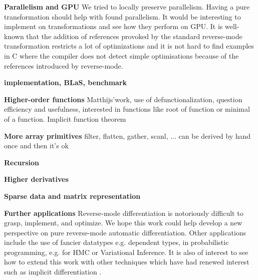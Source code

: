 \noindent \textbf{Parallelism and GPU}
We tried to locally preserve parallelism. Having a pure transformation should help with found parallelism. 
It would be interesting to implement on transformations and see how they perform on GPU.
It is well-known that the addition of references provoked by the standard reverse-mode transformation
restricts a lot of optimizations and it is not hard to find examples in C where the compiler does not detect simple optimisations 
because of the references introduced by reverse-mode.

\noindent \textbf{implementation, BLaS, benchmark}

\noindent \textbf{Higher-order functions}
Matthijs'work, use of defunctionalization, question efficiency and usefulness, 
interested in functions like root of function or minimal of a function. Implicit function theorem

\noindent \textbf{More array primitives}
filter, flatten, gather, scanl, ...
can be derived by hand once and then it's ok

\noindent \textbf{Recursion}

\noindent \textbf{Higher derivatives}

\noindent \textbf{Sparse data and matrix representation}

\noindent \textbf{Further applications}
Reverse-mode differentiation is notoriously difficult to grasp, implement, and optimize.
We hope this work could help develop a new perspective on pure reverse-mode automatic differentiation.
Other applications include the use of fancier datatypes e.g. dependent types, 
in probabilistic programming, e.g. for HMC or Variational Inference. 
It is also of interest to see how to extend this work with other techniques which 
have had renewed interest such as implicit differentiation \cite{blondel2021efficient,lorraine2020optimizing}.



\clearpage